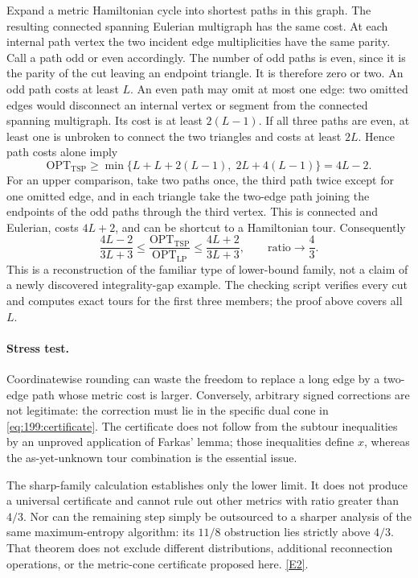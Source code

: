 \documentclass[11pt,a4paper]{article}
\newcommand{\eref}[2]{\hyperlink{extra:#1:#2}{[E#2]}}
\numberwithin{equation}{section}
\begin{document}
Expand a metric Hamiltonian cycle into shortest paths in this graph.
The resulting connected spanning Eulerian multigraph has the same
cost. At each internal path vertex the two incident edge multiplicities
have the same parity. Call a path odd or even accordingly.
The number of odd paths is even, since it is the parity of the cut
leaving an endpoint triangle. It is therefore zero or two.
An odd path costs at least $L$. An even path may omit at most one
edge: two omitted edges would disconnect an internal vertex or segment
from the connected spanning multigraph. Its cost is at least
$2(L-1)$. If all three paths are even, at least one is unbroken to
connect the two triangles and costs at least $2L$. Hence path costs
alone imply
\[
 \mathrm{OPT}_{\mathrm{TSP}}\ge
 \min\{L+L+2(L-1),\;2L+4(L-1)\}=4L-2.
\]
For an upper comparison, take two paths once, the third path twice
except for one omitted edge, and in each triangle take the two-edge
path joining the endpoints of the odd paths through the third vertex.
This is connected and Eulerian, costs $4L+2$, and can be shortcut to
a Hamiltonian tour. Consequently
\begin{equation}\label{eq:199:limit}
 \frac{4L-2}{3L+3}\le
 \frac{\mathrm{OPT}_{\mathrm{TSP}}}{\mathrm{OPT}_{\mathrm{LP}}}
 \le\frac{4L+2}{3L+3},\qquad
                         \text{ratio}\longrightarrow\frac43.
\end{equation}
This is a reconstruction of the familiar type of lower-bound family,
not a claim of a newly discovered integrality-gap example. The checking
script verifies every cut and computes exact tours for the first three
members; the proof above covers all $L$.

\paragraph{Stress test.}
Coordinatewise rounding can waste the freedom to replace a long edge
by a two-edge path whose metric cost is larger. Conversely, arbitrary
signed corrections are not legitimate: the correction must lie in the
specific dual cone in \eqref{eq:199:certificate}. The certificate does
not follow from the subtour inequalities by an unproved application of
Farkas' lemma; those inequalities define $x$, whereas the as-yet-unknown
tour combination is the essential issue.

The sharp-family calculation establishes only the lower limit. It does
not produce a universal certificate and cannot rule out other metrics
with ratio greater than $4/3$. Nor can the remaining step simply be
outsourced to a sharper analysis of the same maximum-entropy algorithm:
its $11/8$ obstruction lies strictly above $4/3$. That theorem does not
exclude different distributions, additional reconnection operations,
or the metric-cone certificate proposed here. \eref{199}{2}.
\end{document}
